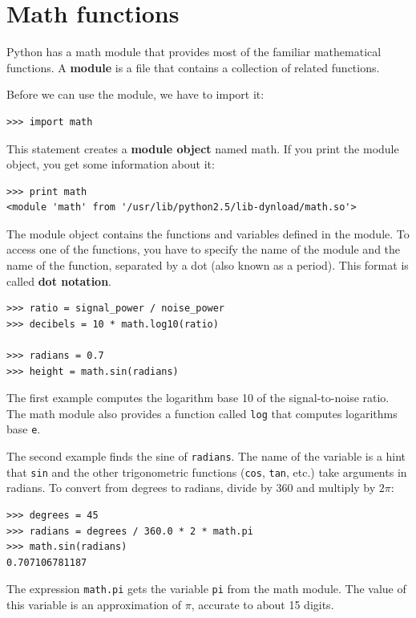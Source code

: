 \documentclass[10pt]{book}
\begin{document}
\section{Math functions}

Python has a math module that provides most of the familiar
mathematical functions.  A {\bf module} is a file that contains a
collection of related functions.


Before we can use the module, we have to import it:

\beforeverb
\begin{verbatim}
>>> import math
\end{verbatim}
\afterverb
%
This statement creates a {\bf module object} named math.  If
you print the module object, you get some information about it:

\beforeverb
\begin{verbatim}
>>> print math
<module 'math' from '/usr/lib/python2.5/lib-dynload/math.so'>
\end{verbatim}
\afterverb
%
The module object contains the functions and variables defined in the
module.  To access one of the functions, you have to specify the name
of the module and the name of the function, separated by a dot (also
known as a period).  This format is called {\bf dot notation}.


\beforeverb
\begin{verbatim}
>>> ratio = signal_power / noise_power
>>> decibels = 10 * math.log10(ratio)

>>> radians = 0.7
>>> height = math.sin(radians)
\end{verbatim}
\afterverb
%
The first example computes the logarithm base 10 of the
signal-to-noise ratio.  The math module also provides a
function called {\tt log} that computes logarithms base {\tt e}.


The second example finds the sine of {\tt radians}.  The name of the
variable is a hint that {\tt sin} and the other trigonometric
functions ({\tt cos}, {\tt tan}, etc.)  take arguments in radians. To
convert from degrees to radians, divide by 360 and multiply by $2
\pi$:

\beforeverb
\begin{verbatim}
>>> degrees = 45
>>> radians = degrees / 360.0 * 2 * math.pi
>>> math.sin(radians)
0.707106781187
\end{verbatim}
\afterverb
%
The expression {\tt math.pi} gets the variable {\tt pi} from the math
module.  The value of this variable is an approximation
of $\pi$, accurate to about 15 digits.
\end{document}
